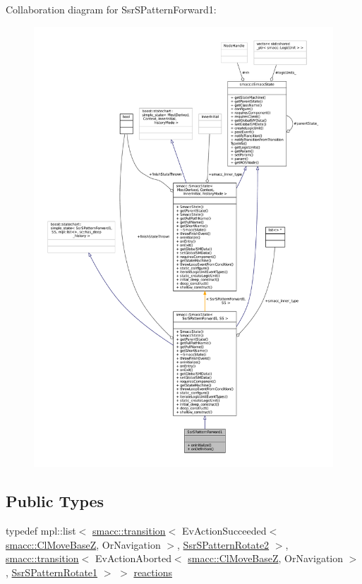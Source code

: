 Collaboration diagram for Ssr\+S\+Pattern\+Forward1\+:
\nopagebreak
\begin{figure}[H]
\begin{center}
\leavevmode
\includegraphics[width=350pt]{structSsrSPatternForward1__coll__graph}
\end{center}
\end{figure}
\subsection*{Public Types}
\begin{DoxyCompactItemize}
\item 
typedef mpl\+::list$<$ \hyperlink{classsmacc_1_1transition}{smacc\+::transition}$<$ Ev\+Action\+Succeeded$<$ \hyperlink{classsmacc_1_1ClMoveBaseZ}{smacc\+::\+Cl\+Move\+BaseZ}, Or\+Navigation $>$, \hyperlink{structSsrSPatternRotate2}{Ssr\+S\+Pattern\+Rotate2} $>$, \hyperlink{classsmacc_1_1transition}{smacc\+::transition}$<$ Ev\+Action\+Aborted$<$ \hyperlink{classsmacc_1_1ClMoveBaseZ}{smacc\+::\+Cl\+Move\+BaseZ}, Or\+Navigation $>$, \hyperlink{structSsrSPatternRotate1}{Ssr\+S\+Pattern\+Rotate1} $>$ $>$ \hyperlink{structSsrSPatternForward1_a78e21524356c8c071893bf7e41a98558}{reactions}
\end{DoxyCompactItemize}

